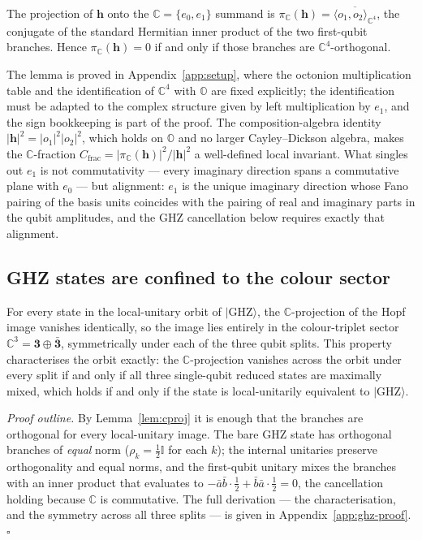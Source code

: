 \begin{lemma}\label{lem:cproj}
The projection of $\mathbf{h}$ onto the $\mathbb{C} = \{e_0,e_1\}$ summand is
$\pi_{\mathbb{C}}(\mathbf{h}) = \overline{\langle o_1, o_2\rangle_{\mathbb{C}^4}}$, the conjugate of
the standard Hermitian inner product of the two first-qubit branches. Hence
$\pi_{\mathbb{C}}(\mathbf{h}) = 0$ if and only if those branches are $\mathbb{C}^4$-orthogonal.
\end{lemma}

The lemma is proved in Appendix~\ref{app:setup}, where the octonion multiplication table and the
identification of $\mathbb{C}^4$ with $\mathbb{O}$ are fixed explicitly; the identification must be
adapted to the complex structure given by left multiplication by $e_1$, and the sign bookkeeping is
part of the proof. The composition-algebra identity $|\mathbf{h}|^2 = |o_1|^2|o_2|^2$, which holds on
$\mathbb{O}$ and no larger Cayley--Dickson algebra, makes the $\mathbb{C}$-fraction
$C_{\mathrm{frac}} = |\pi_{\mathbb{C}}(\mathbf{h})|^2/|\mathbf{h}|^2$ a well-defined local invariant.
What singles out $e_1$ is not commutativity --- every imaginary direction spans a commutative plane
with $e_0$ --- but alignment: $e_1$ is the unique imaginary direction whose Fano pairing of the basis
units coincides with the pairing of real and imaginary parts in the qubit amplitudes, and the GHZ
cancellation below requires exactly that alignment.

\subsection{GHZ states are confined to the colour sector}

\begin{proposition}\label{prop:ghz}
For every state in the local-unitary orbit of $\lvert\mathrm{GHZ}\rangle$, the $\mathbb{C}$-projection
of the Hopf image vanishes identically, so the image lies entirely in the colour-triplet sector
$\mathbb{C}^3 = \mathbf{3}\oplus\bar{\mathbf{3}}$, symmetrically under each of the three qubit splits.
This property characterises the orbit exactly: the $\mathbb{C}$-projection vanishes across the orbit
under every split if and only if all three single-qubit reduced states are maximally mixed, which
holds if and only if the state is local-unitarily equivalent to $\lvert\mathrm{GHZ}\rangle$.
\end{proposition}

\emph{Proof outline.} By Lemma~\ref{lem:cproj} it is enough that the branches are orthogonal for
every local-unitary image. The bare GHZ state has orthogonal branches of \emph{equal} norm
($\rho_k = \tfrac12\mathbb{I}$ for each $k$); the internal unitaries preserve orthogonality and equal
norms, and the first-qubit unitary mixes the branches with an inner product that evaluates to
$-\bar a\bar b\cdot\tfrac12 + \bar b\bar a\cdot\tfrac12 = 0$, the cancellation holding because
$\mathbb{C}$ is commutative. The full derivation --- the characterisation, and the symmetry across
all three splits --- is given in Appendix~\ref{app:ghz-proof}. \hfill$\square$

